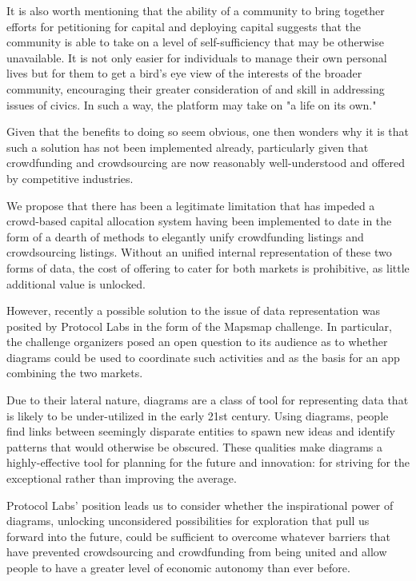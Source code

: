 \documentclass{article}
\begin{document}
It is also worth mentioning that the ability of a community to bring together efforts for petitioning for capital and deploying capital suggests that the community is able to take on a level of self-sufficiency that may be otherwise unavailable. It is not only easier for individuals to manage their own personal lives but for them to get a bird's eye view of the interests of the broader community, encouraging their greater consideration of and skill in addressing issues of civics. 
In such a way, the platform may take on "a life on its own."

Given that the benefits to doing so seem obvious, one then wonders why it is that such a solution has not been implemented already, particularly given that crowdfunding and crowdsourcing are now reasonably well-understood and offered by competitive industries.

We propose that there has been a legitimate limitation that has impeded a crowd-based capital allocation system having been implemented to date in the form of a dearth of methods to elegantly unify crowdfunding listings and crowdsourcing listings. Without an unified internal representation of these two forms of data, the cost of offering to cater for both markets is prohibitive, as little additional value is unlocked.

However, recently a possible solution to the issue of data representation was posited by Protocol Labs in the form of the Mapsmap challenge. In particular, the challenge organizers posed an open question to its audience as to whether diagrams could be used to coordinate such activities and as the basis for an app combining the two markets.

Due to their lateral nature, diagrams are a class of tool for representing data that is likely to be under-utilized in the early 21st century. Using diagrams, people find links between seemingly disparate entities to spawn new ideas and identify patterns that would otherwise be obscured. These qualities make diagrams a highly-effective tool for planning for the future and innovation: for striving for the exceptional rather than improving the average.

Protocol Labs' position leads us to consider whether the inspirational power of diagrams, unlocking unconsidered possibilities for exploration that pull us forward into the future, could be sufficient to overcome whatever barriers that have prevented crowdsourcing and crowdfunding from being united and allow people to have a greater level of economic autonomy than ever before.
\end{document}
